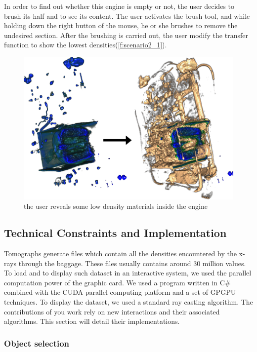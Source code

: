 In order to find out whether this engine is empty or not, the user decides to brush its half and to see its content. The user activates the brush tool, and while holding down the right button of the mouse, he or she brushes to remove the undesired section. After the brushing is carried out, the user modify the transfer function to show the lowest densities(\autoref{f:scenario2_1}).
\begin{figure}
\centering
\includegraphics[width=\textwidth]{Figures/scenario2_3.png}
\caption{ the user reveals some low density materials inside the engine }
\label{f:scenario2_1}
\end{figure}


\subsection{Technical Constraints and Implementation}

Tomographs generate files which contain all the densities encountered by the x-rays through the baggage. These files usually contains around 30 million values. To load and to display such dataset in an interactive system, we used the parallel computation power of the graphic card. We used a program written in C\# combined with the CUDA parallel computing platform and a set of GPGPU techniques. To display the dataset, we used a standard ray casting algorithm. The contributions of you work rely on new interactions and their associated algorithms. This section will detail their implementations.

\subsubsection{Object selection}

